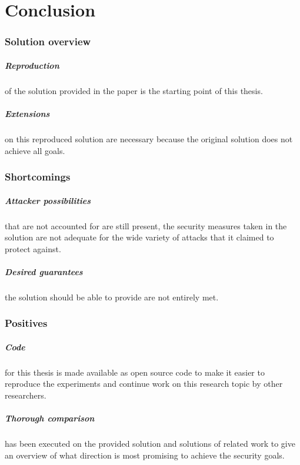 \documentclass{report}
\begin{document}
\chapter{Conclusion}

\subsection*{Solution overview}

\paragraph*{Reproduction}
of the solution provided in the paper is the starting point of this thesis.

\paragraph*{Extensions}
on this reproduced solution are necessary because the original solution does not achieve all goals.

\subsection*{Shortcomings}

\paragraph*{Attacker possibilities}
that are not accounted for are still present, the security measures taken in the solution are not adequate for the wide variety of attacks that it claimed to protect against.

\paragraph*{Desired guarantees}
the solution should be able to provide are not entirely met.

\subsection*{Positives}

\paragraph*{Code}
for this thesis is made available as open source code to make it easier to reproduce the experiments and continue work on this research topic by other researchers.

\paragraph*{Thorough comparison}
has been executed on the provided solution and solutions of related work to give an overview of what direction is most promising to achieve the security goals.
\end{document}
